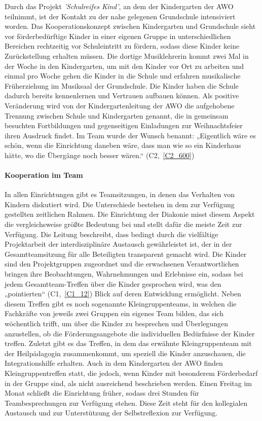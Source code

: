 Durch das Projekt \emph{'Schulreifes Kind'}, an dem der Kindergarten der AWO teilnimmt, ist der Kontakt zu der nahe gelegenen Grundschule intensiviert worden. 
Das Kooperationskonzept zwischen Kindergarten und Grundschule sieht vor förderbedürftige Kinder in einer eigenen Gruppe in unterschiedlichen Bereichen rechtzeitig vor Schuleintritt zu fördern, sodass diese Kinder keine Zurückstellung erhalten müssen.  
Die dortige Musiklehrerin kommt zwei Mal in der Woche in den Kindergarten, um mit den Kinder vor Ort zu arbeiten und einmal pro Woche gehen die Kinder in die Schule und erfahren musikalische Früherziehung im Musiksaal der Grundschule. Die Kinder haben die Schule dadurch bereits kennenlernen und Vertrauen aufbauen können.
Als positive Veränderung wird von der Kindergartenleitung der AWO die aufgehobene Trennung zwischen Schule und Kindergarten genannt, die in gemeinsam besuchten Fortbildungen und gegenseitigen Einladungen zur Weihnachtsfeier ihren Ausdruck findet. Im Team wurde der Wunsch benannt: „Eigentlich wäre es schön, wenn die Einrichtung daneben wäre, dass man wie so ein Kinderhaus hätte, wo die Übergänge noch besser wären.“ (C2,~\ref{C2_600}) 

\paragraph{Kooperation im Team}

In allen Einrichtungen gibt es Teamsitzungen, in denen das Verhalten von Kindern diskutiert wird. Die Unterschiede bestehen in dem zur Verfügung gestellten zeitlichen Rahmen. Die Einrichtung der Diakonie
misst diesem Aspekt die vergleichsweise größte Bedeutung bei und stellt dafür die meiste Zeit zur Verfügung. Die Leitung beschreibt, dass bedingt durch die vielfältige Projektarbeit der interdisziplinäre Austausch gewährleistet ist, der in der Gesamtteamsitzung für alle Beteiligten transparent gemacht wird. Die Kinder sind den Projektgruppen zugeordnet und die erwachsenen Verantwortlichen bringen ihre Beobachtungen, Wahrnehmungen und Erlebnisse ein, sodass bei jedem Gesamtteam-Treffen über die Kinder gesprochen wird, was den „pointierten“ (C1,~\ref{C1_12}) Blick auf deren Entwicklung ermöglicht. Neben diesem Treffen gibt es noch sogenannte Kleingruppenteams, in welchen die Fachkräfte von jeweils zwei Gruppen ein eigenes Team bilden, das sich wöchentlich trifft, um über die Kinder zu besprechen und Überlegungen anzustellen, ob die Förderungsangebote die individuellen Bedürfnisse der Kinder treffen. Zuletzt gibt es das Treffen, in dem das erwähnte Kleingruppenteam mit der Heilpädagogin zusammenkommt, um speziell die Kinder anzuschauen, die Integrationshilfe erhalten. 
Auch in dem Kindergarten der AWO finden Kleingruppentreffen statt, die jedoch, wenn Kinder mit besonderem Förderbedarf in der Gruppe sind, als nicht ausreichend beschrieben werden.    
Einen Freitag im Monat schließt die Einrichtung früher, sodass drei Stunden für Teambesprechungen zur Verfügung stehen. Diese Zeit steht für den kollegialen Austausch und zur Unterstützung der Selbstreflexion zur Verfügung.  

